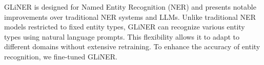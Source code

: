 \documentclass[runningheads]{llncs}
\begin{document}
GLiNER \cite{zaratiana2023glinergeneralistmodelnamed} is designed for Named Entity Recognition (NER) and presents notable improvements over traditional NER systems and LLMs. Unlike traditional NER models restricted to fixed entity types, GLiNER can recognize various entity types using natural language prompts. This flexibility allows it to adapt to different domains without extensive retraining. To enhance the accuracy of entity recognition, we fine-tuned GLiNER.



\end{document}
